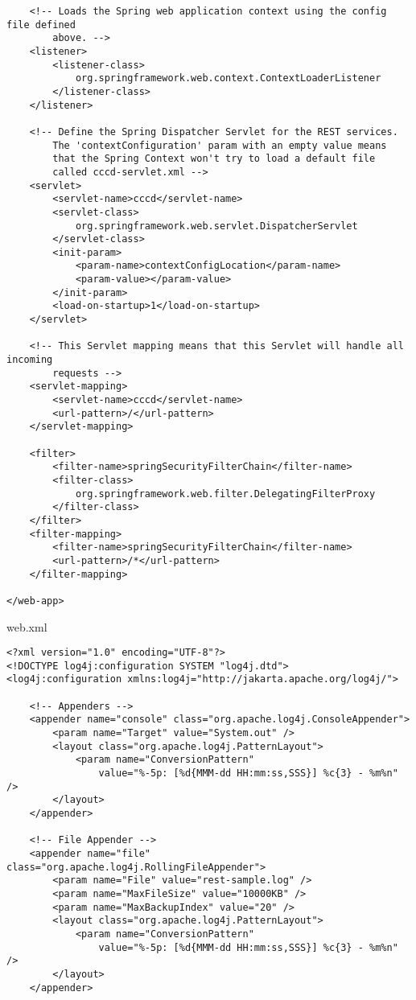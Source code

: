 \begin{appendix}
\begin{code}
\begin{verbatim}
	<!-- Loads the Spring web application context using the config file defined 
		above. -->
	<listener>
		<listener-class>
			org.springframework.web.context.ContextLoaderListener
		</listener-class>
	</listener>

	<!-- Define the Spring Dispatcher Servlet for the REST services. 
		The 'contextConfiguration' param with an empty value means 
		that the Spring Context won't try to load a default file 
		called cccd-servlet.xml -->
	<servlet>
		<servlet-name>cccd</servlet-name>
		<servlet-class>
			org.springframework.web.servlet.DispatcherServlet
		</servlet-class>
		<init-param>
			<param-name>contextConfigLocation</param-name>
			<param-value></param-value>
		</init-param>
		<load-on-startup>1</load-on-startup>
	</servlet>

	<!-- This Servlet mapping means that this Servlet will handle all incoming 
		requests -->
	<servlet-mapping>
		<servlet-name>cccd</servlet-name>
		<url-pattern>/</url-pattern>
	</servlet-mapping>

	<filter>
		<filter-name>springSecurityFilterChain</filter-name>
		<filter-class>
			org.springframework.web.filter.DelegatingFilterProxy
		</filter-class>
	</filter>
	<filter-mapping>
		<filter-name>springSecurityFilterChain</filter-name>
		<url-pattern>/*</url-pattern>
	</filter-mapping>

</web-app>
\end{verbatim}
\caption{web.xml}
\label{lst:web.xml}
\end{code}

\newpage

\begin{code}
\begin{verbatim}
<?xml version="1.0" encoding="UTF-8"?>
<!DOCTYPE log4j:configuration SYSTEM "log4j.dtd">
<log4j:configuration xmlns:log4j="http://jakarta.apache.org/log4j/">

	<!-- Appenders -->
	<appender name="console" class="org.apache.log4j.ConsoleAppender">
		<param name="Target" value="System.out" />
		<layout class="org.apache.log4j.PatternLayout">
			<param name="ConversionPattern" 
				value="%-5p: [%d{MMM-dd HH:mm:ss,SSS}] %c{3} - %m%n" />
		</layout>
	</appender>

	<!-- File Appender -->
	<appender name="file" class="org.apache.log4j.RollingFileAppender">
		<param name="File" value="rest-sample.log" />
		<param name="MaxFileSize" value="10000KB" />
		<param name="MaxBackupIndex" value="20" />
		<layout class="org.apache.log4j.PatternLayout">
			<param name="ConversionPattern" 
				value="%-5p: [%d{MMM-dd HH:mm:ss,SSS}] %c{3} - %m%n" />
		</layout>
	</appender>


\end{verbatim}
\end{code}
\end{appendix}

